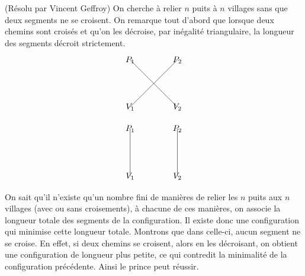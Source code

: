 \begin{sol}[62](Résolu par Vincent Geffroy)
On cherche \`a relier $n$ puits \`a $n$ villages sans que deux segments ne se croisent.
On remarque tout d'abord que lorsque deux chemins sont crois\'es et qu'on les d\'ecroise, par in\'egalit\'e triangulaire, la longueur des segments d\'ecroit strictement.
\[\begin{tikzpicture}[scale=1]
\draw (0, 0)--(2,2 );
\draw (2, 0)--(0,2 );
\node at (0,0) {$V_1$};
\node at (2,0) {$V_2$};
\node at (0,2) {$P_1$};
\node at (2,2) {$P_2$};

\end{tikzpicture}\]

\[\begin{tikzpicture}[scale=1]
\draw (0, 0)--(0,2 );
\draw (2, 0)--(2,2 );
\node at (0,0) {$V_1$};
\node at (2,0) {$V_2$};
\node at (0,2) {$P_1$};
\node at (2,2) {$P_2$};

\end{tikzpicture}\]

On sait qu'il n'existe qu'un nombre fini de mani\`eres de relier les $n$ puits aux $n$ villages (avec ou sans croisements), \`a chacune de ces mani\`eres, on associe la longueur totale des segments de la configuration. Il existe donc une configuration qui minimise cette longueur totale.
Montrons que dans celle-ci, aucun segment ne se croise.
En effet, si deux chemins se croisent, alors en les d\'ecroisant, on obtient une configuration de longueur plus petite, ce qui contredit la minimalit\'e de la configuration pr\'ec\'edente.
Ainsi le prince peut r\'eussir.

\end{sol}

